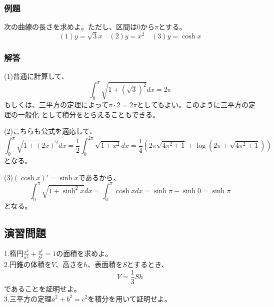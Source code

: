 \documentclass[a4j,dvipdfmx]{jsarticle}
\begin{document}
\subsubsection*{例題}
次の曲線の長さを求めよ。ただし、区間は$0$から$\pi$とする。
\begin{equation*}
    (1)y=\sqrt{3}x\quad (2)y=x^2 \quad(3)y=\cosh x
\end{equation*}
\subsubsection*{解答}
(1)普通に計算して、
\begin{equation*}
    \int_0^\pi \sqrt{1+(\sqrt{3})^2}dx=2\pi
\end{equation*}
もしくは、三平方の定理によって$\pi \cdot 2=2\pi$としてもよい。このように三平方の定理の一般化
として積分をとらえることもできる。

(2)こちらも公式を適応して、
\begin{equation*}
    \int_0^\pi \sqrt{1+(2x)^2}dx=\frac{1}{2}\int_0^{2\pi} \sqrt{1+x^2}dx =\frac{1}{4}\left(2\pi\sqrt{4\pi^2+1}+\log(2\pi+\sqrt{4\pi^2+1})\right)
\end{equation*}
となる。

(3)$(\cosh x)'=\sinh x$であるから、
\begin{equation*}
    \int_0^\pi \sqrt{1+\sinh^2 x}dx=\int_0^\pi \cosh xdx=\sinh\pi -\sinh 0=\sinh \pi
\end{equation*}
となる。
\newpage
\subsection{演習問題}
1.楕円$\displaystyle \frac{x^2}{a^2}+\frac{y^2}{b^2}=1$の面積を求めよ。\\

2.円錐の体積を$V$、高さを$h$、表面積を$S$とするとき、
\begin{equation*}
    V=\frac{1}{3}Sh
\end{equation*}
であることを証明せよ。\\

3.三平方の定理$a^2+b^2=c^2$を積分を用いて証明せよ。\\
\hrulefill
\end{document}

